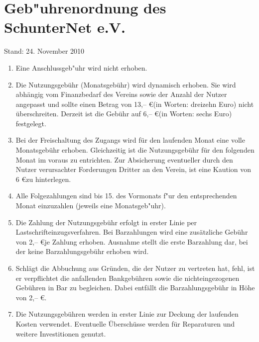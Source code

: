 

\section{Geb"uhrenordnung des SchunterNet e.V.}
\label{gebuehr}

{\small Stand: 24. November 2010}

\begin{enumerate}
\item Eine Anschlussgeb"uhr wird nicht erhoben.

\item Die Nutzungsgebühr (Monatsgebühr) wird dynamisch erhoben. Sie wird
  abhängig vom Finanzbedarf des Vereins sowie der Anzahl der Nutzer
  angepasst und sollte einen Betrag von 13,-- \euro (in Worten: dreizehn
  Euro) nicht überschreiten. Derzeit ist die Gebühr auf 6,-- \euro (in Worten: sechs Euro) festgelegt.
\item Bei der Freischaltung des Zugangs wird für den laufenden Monat
  eine volle Monatsgebühr erhoben. Gleichzeitig ist die Nutzungsgebühr
  für den folgenden Monat im voraus zu entrichten. Zur Absicherung
  eventueller durch den Nutzer verursachter Forderungen Dritter an den
  Verein, ist eine Kaution von 6 \euro zu hinterlegen.

\item Alle Folgezahlungen sind bis 15. des Vormonats f"ur den
  entsprechenden Monat einzuzahlen (jeweils eine Monatsgeb"uhr).

\item  
Die Zahlung der Nutzungsgebühr erfolgt in erster Linie per
Lastschrifteinzugsverfahren. Bei Barzahlungen wird eine zusätzliche
Gebühr von 2,-- \euro je Zahlung erhoben. Ausnahme stellt die erste
Barzahlung dar, bei der keine Barzahlungsgebühr erhoben wird.

\item Schlägt die Abbuchung aus Gründen, die der Nutzer zu vertreten hat, fehl, ist er verpflichtet die anfallenden Bankgebühren sowie die nichteingezogenen Gebühren in Bar zu begleichen. Dabei entfällt die Barzahlungsgebühr in Höhe von 2,-- \euro.
\item  Die Nutzungsgebühren werden in erster Linie zur Deckung der laufenden Kosten verwendet. Eventuelle Überschüsse werden für Reparaturen und weitere Investitionen genutzt.


\end{enumerate}
